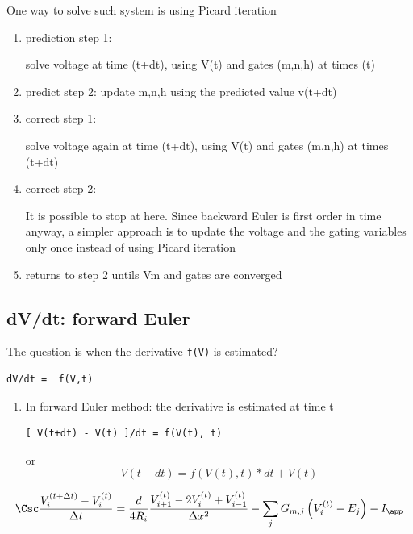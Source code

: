 One way to solve such system is using Picard iteration
\begin{enumerate}
  \item prediction step 1:  
  
  solve voltage at time (t+dt), using V(t) and gates (m,n,h) at times
  (t)
  
  \item predict step 2: update m,n,h using the predicted value v(t+dt)
  
  \item correct step 1:
  
   solve voltage again at time (t+dt), using V(t) and gates (m,n,h) at times
  (t+dt)
  
  \item correct step 2: 
  
It is possible to stop at here.
Since backward Euler is first order in time anyway, a simpler approach is to update
the voltage and the gating variables only once instead of using Picard iteration

  
  \item returns to step 2 untils Vm and gates are converged
\end{enumerate} 

\subsection{dV/dt: forward Euler}
\label{sec:forward-Euler}

The question is when the derivative \verb!f(V)! is estimated?
\begin{verbatim}
dV/dt =  f(V,t)
\end{verbatim}
\begin{enumerate}
  \item In forward Euler method: the derivative is estimated at time t
  
\begin{verbatim}
[ V(t+dt) - V(t) ]/dt = f(V(t), t)
\end{verbatim}
or
\begin{equation}
V(t+dt) = f(V(t), t) * dt + V(t)
\end{equation}
\end{enumerate}

\begin{equation}
  \Csc \frac{V_i^{(t+\Delta t)} - V_i^{(t)}}{\Delta t} = \frac{d}{4R_i}
  \frac{V_{i+1}^{(t)} - 2V_i^{(t)} + V_{i-1}^{(t)}}{\Delta x^2} - \sum_j G_{m,j}
 \left( V_{i}^{(t)} - E_j \right)    - I_\app
\end{equation}

